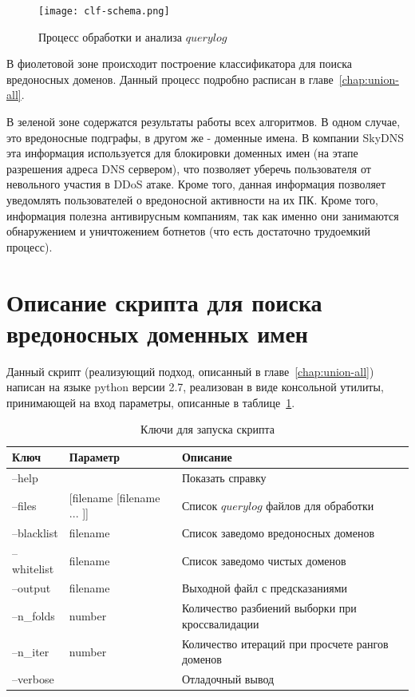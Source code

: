 \documentclass[a4paper,14pt]{extreport} %
\begin{document}
\begin{figure}[H]
	\center
	\texttt{[image: clf-schema.png]}
	\caption{Процесс обработки и анализа $querylog$}
				
	\label{fig:full-proc}
\end{figure}


В фиолетовой зоне происходит построение классификатора для поиска вредоносных доменов. Данный процесс подробно расписан в главе~\ref{chap:union-all}.

В зеленой зоне содержатся результаты работы всех алгоритмов. В одном случае, это вредоносные подграфы, в другом же - доменные имена. В компании SkyDNS эта информация используется для блокировки доменных имен (на этапе разрешения адреса DNS сервером), что позволяет уберечь пользователя от невольного участия в DDoS атаке. Кроме того, данная информация позволяет уведомлять пользователей о вредоносной активности на их ПК. Кроме того, информация полезна антивирусным компаниям, так как именно они занимаются обнаружением и уничтожением ботнетов (что есть достаточно трудоемкий процесс).
\section{Описание скрипта для поиска вредоносных доменных имен}
Данный скрипт (реализующий подход, описанный в главе~\ref{chap:union-all}) написан на языке python версии 2.7, реализован в виде консольной утилиты, принимающей на вход параметры, описанные в таблице~\ref{tab:keys}.
\begin{table}[H]
	\centering
	\caption{Ключи для запуска скрипта}
	\label{tab:keys}
	\begin{tabular}{|p{3cm}|p{5cm}|p{7cm}|}
		\hline
		Ключ    & Параметр           & Описание                                                                           \\ \hline
		--help      &                            & Показать справку                                                            \\ \hline
		--files     & [filename [filename ... ]] & Список $querylog$ файлов для обработки                             \\ \hline
		--blacklist & filename                   & Список заведомо вредоносных доменов                        \\ \hline
		--whitelist & filename                   & Список заведомо чистых доменов                                  \\ \hline
		--output    & filename                   & Выходной файл с предсказаниями                                  \\ \hline
		--n\_folds  & number                     & Количество разбиений выборки при кроссвалидации \\ \hline
		--n\_iter   & number                     & Количество итераций при просчете рангов доменов  \\ \hline
		--verbose   &                            & Отладочный вывод                                                            \\ \hline
	\end{tabular}
\end{table}
\end{document}
